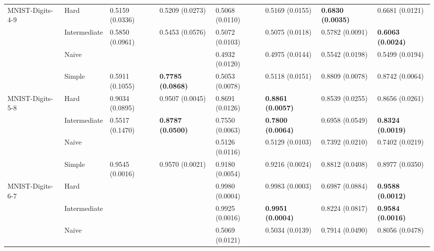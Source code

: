 \begin{tabular}{llllllll}
MNIST-Digits-4-9 & Hard &           0.5159 (0.0336) &           0.5209 (0.0273) &           0.5068 (0.0110) &           0.5169 (0.0155) &  \textbf{0.6830 (0.0035)} &           0.6681 (0.0121) \\
                 & Intermediate &           0.5850 (0.0961) &           0.5453 (0.0576) &           0.5072 (0.0103) &           0.5075 (0.0118) &           0.5782 (0.0091) &  \textbf{0.6063 (0.0024)} \\
                 & Naive &                           &                           &           0.4932 (0.0120) &           0.4975 (0.0144) &           0.5542 (0.0198) &           0.5499 (0.0194) \\
                 & Simple &           0.5911 (0.1055) &  \textbf{0.7785 (0.0868)} &           0.5053 (0.0078) &           0.5118 (0.0151) &           0.8809 (0.0078) &           0.8742 (0.0064) \\
MNIST-Digits-5-8 & Hard &           0.9034 (0.0895) &           0.9507 (0.0045) &           0.8691 (0.0126) &  \textbf{0.8861 (0.0057)} &           0.8539 (0.0255) &           0.8656 (0.0261) \\
                 & Intermediate &           0.5517 (0.1470) &  \textbf{0.8787 (0.0500)} &           0.7550 (0.0063) &  \textbf{0.7800 (0.0064)} &           0.6958 (0.0549) &  \textbf{0.8324 (0.0019)} \\
                 & Naive &                           &                           &           0.5126 (0.0116) &           0.5129 (0.0103) &           0.7392 (0.0210) &           0.7402 (0.0219) \\
                 & Simple &           0.9545 (0.0016) &           0.9570 (0.0021) &           0.9180 (0.0054) &           0.9216 (0.0024) &           0.8812 (0.0408) &           0.8977 (0.0350) \\
MNIST-Digits-6-7 & Hard &                           &                           &           0.9980 (0.0004) &           0.9983 (0.0003) &           0.6987 (0.0884) &  \textbf{0.9588 (0.0012)} \\
                 & Intermediate &                           &                           &           0.9925 (0.0016) &  \textbf{0.9951 (0.0004)} &           0.8224 (0.0817) &  \textbf{0.9584 (0.0016)} \\
                 & Naive &                           &                           &           0.5069 (0.0121) &           0.5034 (0.0139) &           0.7914 (0.0490) &           0.8056 (0.0478) \\

\end{tabular}
